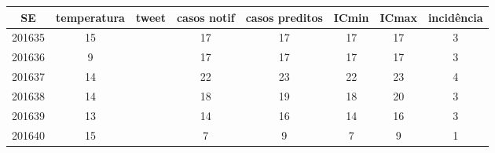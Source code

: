 \begin{tabular}{c|ccccccc}
  \hline
SE & temperatura & tweet & casos notif & casos preditos & ICmin & ICmax & incidência \\ 
  \hline
201635 & 15 &  & 17 & 17 & 17 & 17 & 3 \\ 
  201636 & 9 &  & 17 & 17 & 17 & 17 & 3 \\ 
  201637 & 14 &  & 22 & 23 & 22 & 23 & 4 \\ 
  201638 & 14 &  & 18 & 19 & 18 & 20 & 3 \\ 
  201639 & 13 &  & 14 & 16 & 14 & 16 & 3 \\ 
  201640 & 15 &  & 7 & 9 & 7 & 9 & 1 \\ 
   \hline
\end{tabular}
